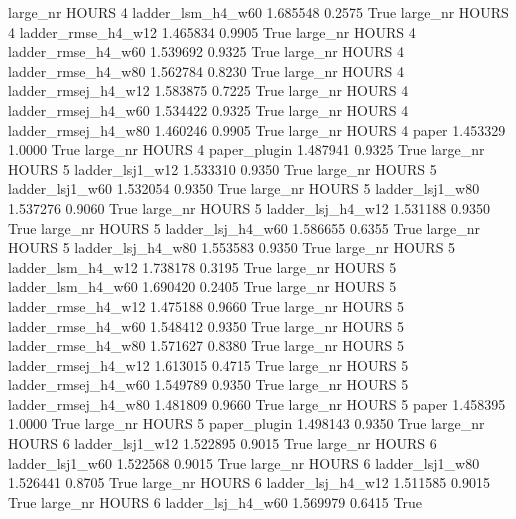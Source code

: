   large_nr    HOURS                 4   ladder_lsm_h4_w60   1.685548      0.2575    True
  large_nr    HOURS                 4  ladder_rmse_h4_w12   1.465834      0.9905    True
  large_nr    HOURS                 4  ladder_rmse_h4_w60   1.539692      0.9325    True
  large_nr    HOURS                 4  ladder_rmse_h4_w80   1.562784      0.8230    True
  large_nr    HOURS                 4 ladder_rmsej_h4_w12   1.583875      0.7225    True
  large_nr    HOURS                 4 ladder_rmsej_h4_w60   1.534422      0.9325    True
  large_nr    HOURS                 4 ladder_rmsej_h4_w80   1.460246      0.9905    True
  large_nr    HOURS                 4               paper   1.453329      1.0000    True
  large_nr    HOURS                 4        paper_plugin   1.487941      0.9325    True
  large_nr    HOURS                 5     ladder_lsj1_w12   1.533310      0.9350    True
  large_nr    HOURS                 5     ladder_lsj1_w60   1.532054      0.9350    True
  large_nr    HOURS                 5     ladder_lsj1_w80   1.537276      0.9060    True
  large_nr    HOURS                 5   ladder_lsj_h4_w12   1.531188      0.9350    True
  large_nr    HOURS                 5   ladder_lsj_h4_w60   1.586655      0.6355    True
  large_nr    HOURS                 5   ladder_lsj_h4_w80   1.553583      0.9350    True
  large_nr    HOURS                 5   ladder_lsm_h4_w12   1.738178      0.3195    True
  large_nr    HOURS                 5   ladder_lsm_h4_w60   1.690420      0.2405    True
  large_nr    HOURS                 5  ladder_rmse_h4_w12   1.475188      0.9660    True
  large_nr    HOURS                 5  ladder_rmse_h4_w60   1.548412      0.9350    True
  large_nr    HOURS                 5  ladder_rmse_h4_w80   1.571627      0.8380    True
  large_nr    HOURS                 5 ladder_rmsej_h4_w12   1.613015      0.4715    True
  large_nr    HOURS                 5 ladder_rmsej_h4_w60   1.549789      0.9350    True
  large_nr    HOURS                 5 ladder_rmsej_h4_w80   1.481809      0.9660    True
  large_nr    HOURS                 5               paper   1.458395      1.0000    True
  large_nr    HOURS                 5        paper_plugin   1.498143      0.9350    True
  large_nr    HOURS                 6     ladder_lsj1_w12   1.522895      0.9015    True
  large_nr    HOURS                 6     ladder_lsj1_w60   1.522568      0.9015    True
  large_nr    HOURS                 6     ladder_lsj1_w80   1.526441      0.8705    True
  large_nr    HOURS                 6   ladder_lsj_h4_w12   1.511585      0.9015    True
  large_nr    HOURS                 6   ladder_lsj_h4_w60   1.569979      0.6415    True
